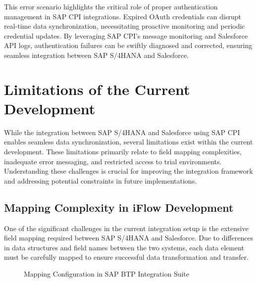 This error scenario highlights the critical role of proper authentication management in SAP CPI integrations. Expired OAuth credentials can disrupt real-time data synchronization, necessitating proactive monitoring and periodic credential updates. By leveraging SAP CPI’s message monitoring and Salesforce API logs, authentication failures can be swiftly diagnosed and corrected, ensuring seamless integration between SAP S/4HANA and Salesforce.



\section{Limitations of the Current Development}

While the integration between SAP S/4HANA and Salesforce using SAP CPI enables seamless data synchronization, several limitations exist within the current development. These limitations primarily relate to field mapping complexities, inadequate error messaging, and restricted access to trial environments. Understanding these challenges is crucial for improving the integration framework and addressing potential constraints in future implementations.

\subsection{Mapping Complexity in iFlow Development}
One of the significant challenges in the current integration setup is the extensive field mapping required between SAP S/4HANA and Salesforce. Due to differences in data structures and field names between the two systems, each data element must be carefully mapped to ensure successful data transformation and transfer.

    \begin{figure}[H]
    \centering
    \caption{Mapping Configuration in SAP BTP Integration Suite}
    
    \end{figure}

